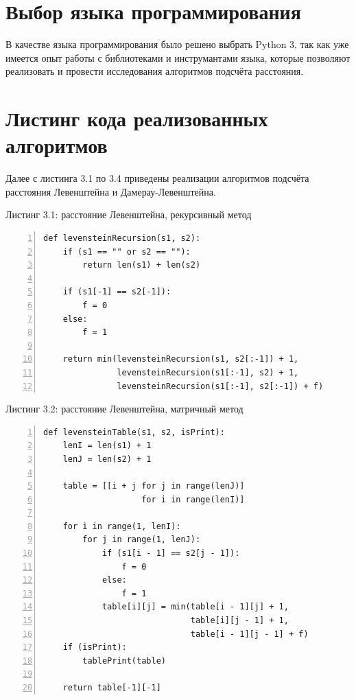 \documentclass[12pt,a4paper]{report}
\begin{document}
\section{Выбор языка программирования}

В качестве языка программирования было решено выбрать Python 3, так как уже имеется опыт работы с 
библиотеками и инструмантами языка, которые позволяют реализовать и провести исследования алгоритмов
подсчёта расстояния.

\section{Листинг кода реализованных алгоритмов}

Далее с листинга 3.1 по 3.4 приведены реализации алгоритмов подсчёта расстояния Левенштейна и Дамерау-Левенштейна.

\textrm{Листинг 3.1: расстояние Левенштейна, рекурсивный метод}
\begin{lstlisting}[frame=single, numbers=left]
def levensteinRecursion(s1, s2):
    if (s1 == "" or s2 == ""):
        return len(s1) + len(s2)

    if (s1[-1] == s2[-1]): 
        f = 0 
    else: 
        f = 1

    return min(levensteinRecursion(s1, s2[:-1]) + 1,
               levensteinRecursion(s1[:-1], s2) + 1,
               levensteinRecursion(s1[:-1], s2[:-1]) + f)
\end{lstlisting}


\textrm{Листинг 3.2: расстояние Левенштейна, матричный метод}
\begin{lstlisting}[frame=single, numbers=left]
def levensteinTable(s1, s2, isPrint):
    lenI = len(s1) + 1
    lenJ = len(s2) + 1

    table = [[i + j for j in range(lenJ)] 
                    for i in range(lenI)]

    for i in range(1, lenI):
        for j in range(1, lenJ):
            if (s1[i - 1] == s2[j - 1]):
                f = 0 
            else:
                f = 1
            table[i][j] = min(table[i - 1][j] + 1,
                              table[i][j - 1] + 1,
                              table[i - 1][j - 1] + f)
    if (isPrint):
        tablePrint(table)
    
    return table[-1][-1]
\end{lstlisting}
\end{document}
